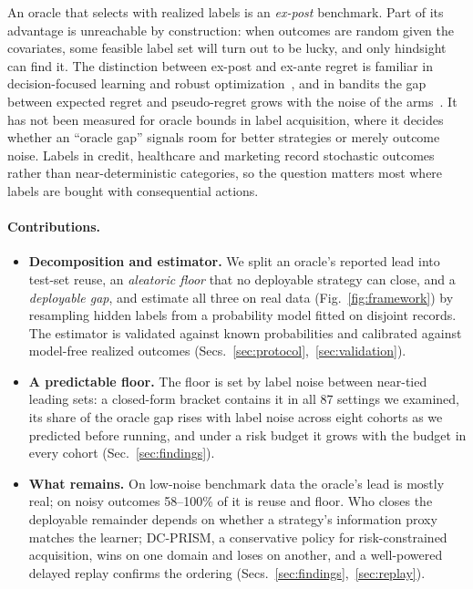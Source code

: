 \documentclass[runningheads]{llncs}
\begin{document}
An oracle that selects with realized labels is an \emph{ex-post} benchmark. Part of its advantage is unreachable by construction: when outcomes are random given the covariates, some feasible label set will turn out to be lucky, and only hindsight can find it. The distinction between ex-post and ex-ante regret is familiar in decision-focused learning and robust optimization~\cite{schutte2023robust}, and in bandits the gap between expected regret and pseudo-regret grows with the noise of the arms~\cite{bubeck2012regret,audibert2010regret}. It has not been measured for oracle bounds in label acquisition, where it decides whether an ``oracle gap'' signals room for better strategies or merely outcome noise. Labels in credit, healthcare and marketing record stochastic outcomes rather than near-deterministic categories, so the question matters most where labels are bought with consequential actions.

\paragraph{Contributions.}
\begin{itemize}
\item \textbf{Decomposition and estimator.} We split an oracle's reported lead into test-set reuse, an \emph{aleatoric floor} that no deployable strategy can close, and a \emph{deployable gap}, and estimate all three on real data (Fig.~\ref{fig:framework}) by resampling hidden labels from a probability model fitted on disjoint records. The estimator is validated against known probabilities and calibrated against model-free realized outcomes (Secs.~\ref{sec:protocol},~\ref{sec:validation}).
\item \textbf{A predictable floor.} The floor is set by label noise between near-tied leading sets: a closed-form bracket contains it in all 87 settings we examined, its share of the oracle gap rises with label noise across eight cohorts as we predicted before running, and under a risk budget it grows with the budget in every cohort (Sec.~\ref{sec:findings}).
\item \textbf{What remains.} On low-noise benchmark data the oracle's lead is mostly real; on noisy outcomes 58--100\% of it is reuse and floor. Who closes the deployable remainder depends on whether a strategy's information proxy matches the learner; DC-PRISM, a conservative policy for risk-constrained acquisition, wins on one domain and loses on another, and a well-powered delayed replay confirms the ordering (Secs.~\ref{sec:findings},~\ref{sec:replay}).
\end{itemize}
\end{document}

